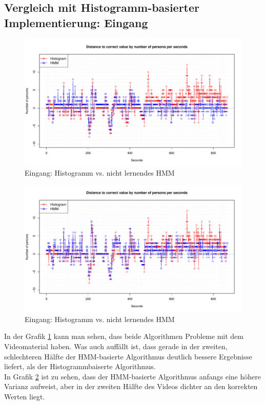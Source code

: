 \subsection{Vergleich mit Histogramm-basierter Implementierung: Eingang}
\label{sec:eval_eingang}
\begin{figure}
	\centering
\includegraphics[width=1\textwidth]{bilder/safest_plot_eingang2_nolearn.pdf}
	\caption{Eingang: Histogramm vs. nicht lernendes HMM}
	\label{fig:Eingang-nolearn}
\end{figure}
\begin{figure}
	\centering
\includegraphics[width=1\textwidth]{bilder/safest_plot_eingang2_learn.pdf}
	\caption{Eingang: Histogramm vs. nicht lernendes HMM}
	\label{fig:Eingang-learn}
\end{figure}
In der Grafik \ref{fig:Eingang-nolearn} kann man sehen, dass beide Algorithmen Probleme mit dem Videomaterial haben. Was auch auffällt ist, dass gerade in der zweiten, schlechteren Hälfte der HMM-basierte Algorithmus deutlich bessere Ergebnisse liefert, als der Histogrammbaiserte Algorithmus.\\
In Grafik \ref{fig:Eingang-learn} ist zu sehen, dass der HMM-basierte Algorithmus anfangs eine höhere Varianz aufweist, aber in der zweiten Hälfte des Videos dichter an den korrekten Werten liegt.


